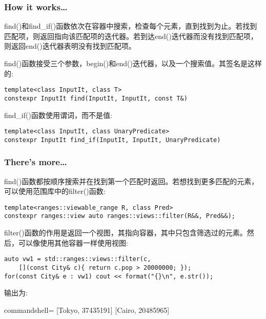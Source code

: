 \subsubsection{How it works…}

find()和find\_if()函数依次在容器中搜索，检查每个元素，直到找到为止。若找到匹配项，则返回指向该匹配项的迭代器。若到达end()迭代器而没有找到匹配项，则返回end()迭代器表明没有找到匹配项。

find()函数接受三个参数，begin()和end()迭代器，以及一个搜索值。其签名是这样的:

\begin{lstlisting}[style=styleCXX]
template<class InputIt, class T>
constexpr InputIt find(InputIt, InputIt, const T&)
\end{lstlisting}

find\_if()函数使用谓词，而不是值:

\begin{lstlisting}[style=styleCXX]
template<class InputIt, class UnaryPredicate>
constexpr InputIt find_if(InputIt, InputIt, UnaryPredicate)
\end{lstlisting}


\subsubsection{There's more…}

find()函数都按顺序搜索并在找到第一个匹配时返回。若想找到更多匹配的元素，可以使用范围库中的filter()函数:

\begin{lstlisting}[style=styleCXX]
template<ranges::viewable_range R, class Pred>
constexpr ranges::view auto ranges::views::filter(R&&, Pred&&);
\end{lstlisting}

filter()函数的作用是返回一个视图，其指向容器，其中只包含筛选过的元素。然后，可以像使用其他容器一样使用视图:

\begin{lstlisting}[style=styleCXX]
auto vw1 = std::ranges::views::filter(c,
	[](const City& c){ return c.pop > 20000000; });
for(const City& e : vw1) cout << format("{}\n", e.str());
\end{lstlisting}

输出为:

\begin{tcblisting}{commandshell={}}
[Tokyo, 37435191]
[Cairo, 20485965]
\end{tcblisting}
